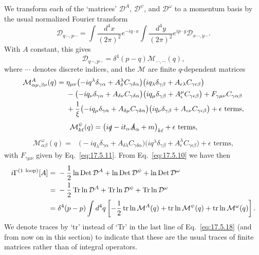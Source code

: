 We transform each of the `matrices' $\mathcal D^A$, $\mathcal D^\psi$, and
$\mathcal D^\omega$ to a momentum basis by the usual normalized Fourier transform
\begin{equation}
\mathcal D_{q\cdots,p\cdots}
=\int\frac{d^4x}{(2\pi)^2}e^{-iq\cdot x}
 \int\frac{d^4y}{(2\pi)^2}e^{ip\cdot y}\mathcal D_{x\cdots,y\cdots}.
\label{eq:17.5.13}
\end{equation}
With $A$ constant, this gives
\begin{equation}
\mathcal D_{q\cdots,p\cdots}=\delta^4(p-q)\mathcal M_{\cdots,\cdots}(q),
\label{eq:17.5.14}
\end{equation}
where $\cdots$ denotes discrete indices, and the $\mathcal M$ are finite
$q$-dependent matrices
\begin{align}
\mathcal M^A_{\alpha\mu,\beta\nu}(q)={}&
\eta_{\mu\nu}\bigl(-iq^\lambda\delta_{\gamma\alpha}
+A_\delta^\lambda C_{\gamma\delta\alpha}\bigr)
\bigl(iq_\lambda\delta_{\gamma\beta}
+A_{\epsilon\lambda}C_{\gamma\epsilon\beta}\bigr)
\notag\\
&-\bigl(-iq_\nu\delta_{\gamma\alpha}
+A_{\delta\nu}C_{\gamma\delta\alpha}\bigr)
\bigl(iq_\mu\delta_{\gamma\beta}
+A_\epsilon^\mu C_{\gamma\epsilon\beta}\bigr)
+F_{\gamma\mu\nu}C_{\gamma\alpha\beta}
\notag\\
&+\frac1\xi\bigl(-iq_\mu\delta_{\gamma\alpha}
+A_{\delta\mu}C_{\gamma\delta\alpha}\bigr)
\bigl(iq_\nu\delta_{\gamma\beta}
+A_{\epsilon\nu}C_{\gamma\epsilon\beta}\bigr)
+\epsilon\text{ terms},
\label{eq:17.5.15}
\end{align}
\begin{equation}
\mathcal M^\psi_{k\ell}(q)
=\bigl(i\sl q-it_\alpha\sl A_\alpha+m\bigr)_{k\ell}
+\epsilon\text{ terms},
\label{eq:17.5.16}
\end{equation}
\begin{align}
\mathcal M^\omega_{\alpha\beta}(q)={}&
\bigl(-iq_\lambda\delta_{\gamma\alpha}
+A_{\delta\lambda}C_{\gamma\delta\alpha}\bigr)
\bigl(iq^\lambda\delta_{\gamma\beta}
+A_\epsilon^\lambda C_{\gamma\epsilon\beta}\bigr)
+\epsilon\text{ terms},
\label{eq:17.5.17}
\end{align}
with $F_{\gamma\mu\nu}$ given by Eq.~\eqref{eq:17.5.11}. From
Eq.~\eqref{eq:17.5.10} we have then
\begin{align}
i\Gamma^{(1\ \mathrm{loop})}[A]
={}&-\frac12\ln\operatorname{Det}\mathcal D^A
+\ln\operatorname{Det}\mathcal D^\psi
+\ln\operatorname{Det}\mathcal D^\omega
\notag\\
={}&-\frac12\operatorname{Tr}\ln\mathcal D^A
+\operatorname{Tr}\ln\mathcal D^\psi
+\operatorname{Tr}\ln\mathcal D^\omega
\notag\\
={}&\delta^4(p-p)\int d^4q\left[-\frac12\operatorname{tr}\ln\mathcal M^A(q)
+\operatorname{tr}\ln\mathcal M^\psi(q)
+\operatorname{tr}\ln\mathcal M^\omega(q)\right].
\label{eq:17.5.18}
\end{align}
We denote traces by `tr' instead of `Tr' in the last line of
Eq.~\eqref{eq:17.5.18} (and from now on in this section) to indicate that
these are the usual traces of finite matrices rather than of integral operators.

